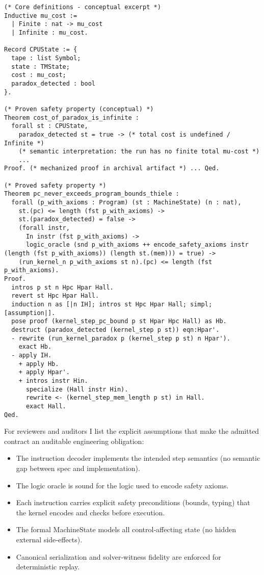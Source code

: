 \documentclass[11pt]{article}
\begin{document}
\begin{verbatim}
(* Core definitions - conceptual excerpt *)
Inductive mu_cost :=
  | Finite : nat -> mu_cost
  | Infinite : mu_cost.

Record CPUState := {
  tape : list Symbol;
  state : TMState;
  cost : mu_cost;
  paradox_detected : bool
}.

(* Proven safety property (conceptual) *)
Theorem cost_of_paradox_is_infinite :
  forall st : CPUState,
    paradox_detected st = true -> (* total cost is undefined / Infinite *)
    (* semantic interpretation: the run has no finite total mu-cost *)
    ...
Proof. (* mechanized proof in archival artifact *) ... Qed.

(* Proved safety property *)
Theorem pc_never_exceeds_program_bounds_thiele :
  forall (p_with_axioms : Program) (st : MachineState) (n : nat),
    st.(pc) <= length (fst p_with_axioms) ->
    st.(paradox_detected) = false ->
    (forall instr,
      In instr (fst p_with_axioms) ->
      logic_oracle (snd p_with_axioms ++ encode_safety_axioms instr (length (fst p_with_axioms)) (length st.(mem))) = true) ->
    (run_kernel_n p_with_axioms st n).(pc) <= length (fst p_with_axioms).
Proof.
  intros p st n Hpc Hpar Hall.
  revert st Hpc Hpar Hall.
  induction n as [|n IH]; intros st Hpc Hpar Hall; simpl; [assumption|].
  pose proof (kernel_step_pc_bound p st Hpar Hpc Hall) as Hb.
  destruct (paradox_detected (kernel_step p st)) eqn:Hpar'.
  - rewrite (run_kernel_paradox p (kernel_step p st) n Hpar').
    exact Hb.
  - apply IH.
    + apply Hb.
    + apply Hpar'.
    + intros instr Hin.
      specialize (Hall instr Hin).
      rewrite <- (kernel_step_mem_length p st) in Hall.
      exact Hall.
Qed.
\end{verbatim}

For reviewers and auditors I list the explicit assumptions that make the admitted contract an auditable engineering obligation:
\begin{itemize}
  \item The instruction decoder implements the intended step semantics (no semantic gap between spec and implementation).
  \item The logic oracle is sound for the logic used to encode safety axioms.
  \item Each instruction carries explicit safety preconditions (bounds, typing) that the kernel encodes and checks before execution.
  \item The formal MachineState models all control‑affecting state (no hidden external side‑effects).
  \item Canonical serialization and solver‑witness fidelity are enforced for deterministic replay.
\end{itemize}
\end{document}
